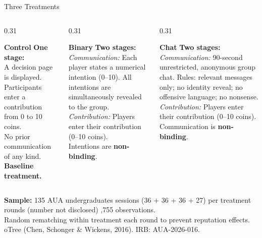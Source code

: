 \documentclass[aspectratio=169,10pt]{beamer}
\newcommand{\cg}[1]{\textcolor{controlgreen}{\textbf{#1}}}
\newcommand{\bo}[1]{\textcolor{binaryorange}{\textbf{#1}}}
\newcommand{\cb}[1]{\textcolor{chatblue}{\textbf{#1}}}
\begin{document}
\begin{frame}{Three Treatments}

\begin{columns}[T]
  \begin{column}{0.31\textwidth}
    \begin{block}{\cg{Control}}
      \small
      \textbf{One stage:}\\[0.3em]
      A decision page is displayed.
      Participants enter a contribution
      from 0 to 10 coins.\\[0.3em]
      No prior communication of any kind.\\[0.3em]
      \textbf{Baseline treatment.}
    \end{block}
  \end{column}

  \begin{column}{0.31\textwidth}
    \begin{block}{\bo{Binary}}
      \small
      \textbf{Two stages:}\\[0.3em]
      \textit{Communication:} Each player states a numerical intention (0--10).
      All intentions are simultaneously revealed to the group.\\[0.3em]
      \textit{Contribution:} Players enter their contribution (0--10 coins).\\[0.3em]
      Intentions are \textbf{non-binding}.
    \end{block}
  \end{column}

  \begin{column}{0.31\textwidth}
    \begin{block}{\cb{Chat}}
      \small
      \textbf{Two stages:}\\[0.3em]
      \textit{Communication:} 90-second unrestricted, anonymous group chat.
      Rules: relevant messages only; no identity reveal; no offensive language; no nonsense.\\[0.3em]
      \textit{Contribution:} Players enter their contribution (0--10 coins).\\[0.3em]
      Communication is \textbf{non-binding}.
    \end{block}
  \end{column}
\end{columns}

\vspace{0.45em}
\small
\textbf{Sample:} 135 AUA undergraduates \textbullet{} sessions (36 + 36 + 36 + 27) \textbullet{} per treatment \textbullet{} rounds (number not disclosed) \textbullet{},755 observations.\\
Random rematching within treatment each round to prevent reputation effects.
oTree (Chen, Schonger \& Wickens, 2016). \; IRB: AUA-2026-016.

\end{frame}
\end{document}
